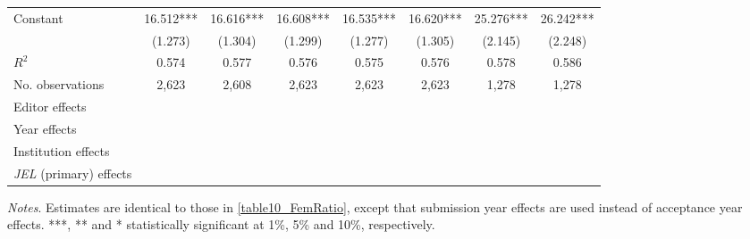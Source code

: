 \begin{table}[H]
\begin{adjustwidth}{-0.085cm}{}
\begin{threeparttable}
\begin{tabular}{p{2.64cm}SSSSSSS}
            Constant                      &      16.512***&      16.616***&      16.608***&      16.535***&      16.620***&      25.276***&      26.242***\\
                                          &     (1.273)   &     (1.304)   &     (1.299)   &     (1.277)   &     (1.305)   &     (2.145)   &     (2.248)   \\
            \midrule
            \(R^2\)                       &       0.574   &       0.577   &       0.576   &       0.575   &       0.576   &       0.578   &       0.586   \\
            No. observations              &       2,623   &       2,608   &       2,623   &       2,623   &       2,623   &       1,278   &       1,278   \\
            \midrule
            Editor effects       &           {}   &           {}   &           {}   &           {}   &           {}   &           {}   &           {}   \\
            Year effects                  &           {}   &           {}   &           {}   &           {}   &           {}   &           {}   &           {}   \\
            Institution effects           &           {}   &           {}   &           {}   &           {}   &           {}   &           {}   &           {}   \\
            \textit{JEL} (primary) effects&               &               &               &               &               &               &           {}   \\
            \bottomrule
        \end{tabular}
        \begin{tablenotes}
            \tiny
            \item \textit{Notes}. Estimates are identical to those in \autoref{table10_FemRatio}, except that submission year effects are used instead of acceptance year effects. ***, ** and * statistically significant at 1\%, 5\% and 10\%, respectively.
        \end{tablenotes}
    \end{threeparttable}
    \end{adjustwidth}
\end{table}